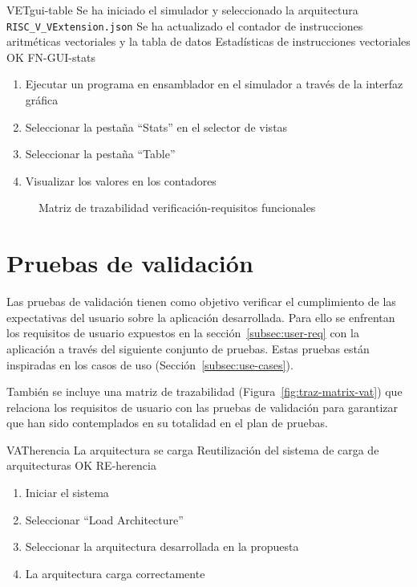 \begin{testCase}{VET}{gui-table}
    {Se ha iniciado el simulador y seleccionado la arquitectura \texttt{RISC\_V\_VExtension.json}}
    {Se ha actualizado el contador de instrucciones aritméticas vectoriales y la tabla de datos}
    {Estadísticas de instrucciones vectoriales} %
    {OK} %
    {FN-GUI-stats}
    \begin{enumerate}
        \item Ejecutar un programa en ensamblador en el simulador a través de la interfaz gráfica
        \item Seleccionar la pestaña ``Stats'' en el selector de vistas
        \item Seleccionar la pestaña ``Table''
        \item Visualizar los valores en los contadores
    \end{enumerate}
\end{testCase}

{\FloatBarrier}
\begin{figure}
    {}
    \caption{Matriz de trazabilidad verificación-requisitos funcionales}\label{fig:traz-matrix-vet}
\end{figure}

{\FloatBarrier}
\section{Pruebas de validación}\label{sec:validation}

Las pruebas de validación tienen como objetivo verificar el cumplimiento de las expectativas del usuario sobre la aplicación desarrollada. Para ello se enfrentan los requisitos de usuario expuestos en la sección~\ref{subsec:user-req} con la aplicación a través del siguiente conjunto de pruebas. Estas pruebas están inspiradas en los casos de uso (Sección~\ref{subsec:use-cases}).

También se incluye una matriz de trazabilidad (Figura~\ref{fig:traz-matrix-vat}) que relaciona los requisitos de usuario con las pruebas de validación para garantizar que han sido contemplados en su totalidad en el plan de pruebas.

\begin{testCase}{VAT}{herencia}
    {\NA}
    {La arquitectura se carga}
    {Reutilización del sistema de carga de arquitecturas}
    {OK} %
    {RE-herencia}
    \begin{enumerate}
        \item Iniciar el sistema
        \item Seleccionar ``Load Architecture''
        \item Seleccionar la arquitectura desarrollada en la propuesta
        \item La arquitectura carga correctamente
    \end{enumerate}
\end{testCase}

